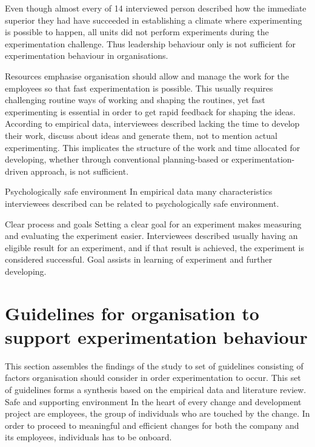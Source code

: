 Even though almost every of 14 interviewed person described how the immediate superior they had have succeeded in establishing a climate where experimenting is possible to happen, all units did not perform experiments during the experimentation challenge. Thus leadership behaviour only is not sufficient for experimentation behaviour in organisations.

Resources \newline
\citet{thomke2001enlightened} emphasise organisation should allow and manage the work for the employees so that fast experimentation is possible. This usually requires challenging routine ways of working and shaping the routines, yet fast experimenting is essential in order to get rapid feedback for shaping the ideas. According to empirical data, interviewees described lacking the time to develop their work, discuss about ideas and generate them, not to mention actual experimenting. This implicates the structure of the work and time allocated for developing, whether through conventional planning-based or experimentation-driven approach, is not sufficient. 

Psychologically safe environment
\newline
In empirical data many characteristics interviewees described can be related to psychologically safe environment. 

Clear process and goals\newline
Setting a clear goal for an experiment makes measuring and evaluating the experiment easier. Interviewees described usually having an eligible result for an experiment, and if that result is achieved, the experiment is considered successful. Goal assists in learning of experiment and further developing. 

\section{Guidelines for organisation to support experimentation behaviour} \label{framework}
This section assembles the findings of the study to set of guidelines consisting of factors organisation should consider in order experimentation to occur. This set of guidelines forms a synthesis based on the empirical data and literature review. 
\newline
\newline
Safe and supporting environment \newline
In the heart of every change and development project are employees, the group of individuals who are touched by the change. In order to proceed to meaningful and efficient changes for both the company and its employees, individuals has to be onboard. 

